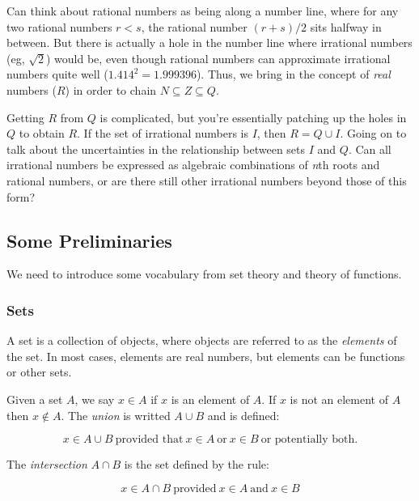 \documentclass{article}
\numberwithin{equation}{subsection}
\numberwithin{theo}{subsection}
\begin{document}
Can think about rational numbers as being along a number line, where for any two
rational numbers $r<s$, the rational number $(r+s)/2$ sits halfway in between.
But there is actually a hole in the number line where irrational numbers (eg,
$\sqrt{2}$) would be, even though rational numbers can approximate irrational
numbers quite well ($1.414^2 = 1.999396$). Thus, we bring in the concept of
\emph{real} numbers ($R$) in order to chain $N \subseteq Z \subseteq Q$.

Getting $R$ from $Q$ is complicated, but you're essentially patching up the
holes in $Q$ to obtain $R$. If the set of irrational numbers is $I$, then $R = Q
\cup I$. Going on to talk about the uncertainties in the relationship between
sets $I$ and $Q$. Can all irrational numbers be expressed as algebraic
combinations of \emph{n}th roots and rational numbers, or are there still other
irrational numbers beyond those of this form?


\subsection{Some Preliminaries}

We need to introduce some vocabulary from set theory and theory of functions.

\subsubsection*{Sets}

A set is a collection of objects, where objects are referred to as the
\emph{elements} of the set. In most cases, elements are real numbers, but
elements can be functions or other sets. 

Given a set $A$, we say $x \in A$ if $x$ is an element of $A$. If $x$ is not
an element of $A$ then $x \notin A$. The \emph{union} is writted $A\cup B$ and
is defined:

\begin{equation*}
    x \in A \cup B~\text{provided that}~ x \in A ~\text{or}~ x \in B ~\text{or
    potentially both}.
\end{equation*}

The \emph{intersection} $A \cap B$ is the set defined by the rule:

\begin{equation*}
    x \in A \cap B ~ \text{provided} ~ x \in A ~ \text{and} ~ x \in B
\end{equation*}
\end{document}
